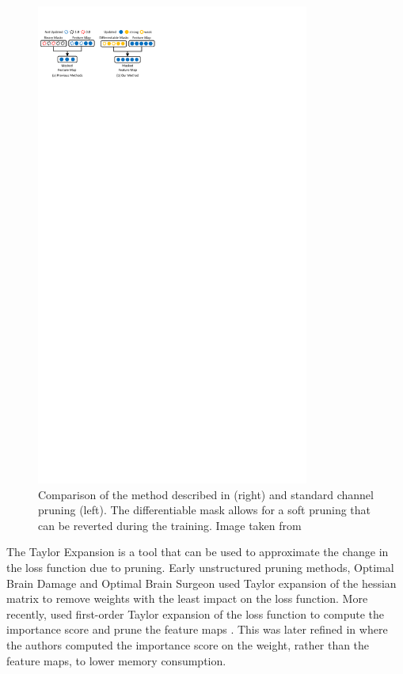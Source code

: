 \begin{figure}[htbp]
    \centering
    \includegraphics[width=0.8\textwidth,trim=0 0.4cm 0 0, clip]{chapter_sota/assets/operation_aware.pdf}
    \caption{Comparison of the method described in \cite{DBLP:conf/icml/KangH20}
    (right) and standard channel pruning (left). The differentiable mask allows
    for a soft pruning that can be reverted during the training. Image taken
    from \cite{DBLP:conf/icml/KangH20}}
    \label{fig:sota:operation_aware}
\end{figure}


The Taylor Expansion is a tool that can be used to approximate the change in the
loss function due to pruning. Early unstructured pruning methods, Optimal Brain
Damage \cite{DBLP:conf/nips/CunDS89} and Optimal Brain Surgeon
\cite{DBLP:conf/icnn/HassibiSW93} used Taylor expansion of the hessian matrix to
remove weights with the least impact on the loss function. More recently,
\citeauthor{DBLP:conf/iclr/MolchanovTKAK17} used first-order Taylor expansion of
the loss function to compute the importance score and prune the feature maps
\cite{DBLP:conf/iclr/MolchanovTKAK17}. This was later refined in
\cite{DBLP:conf/cvpr/MolchanovMTFK19} where the authors computed the importance
score on the weight, rather than the feature maps, to lower memory consumption.\\

